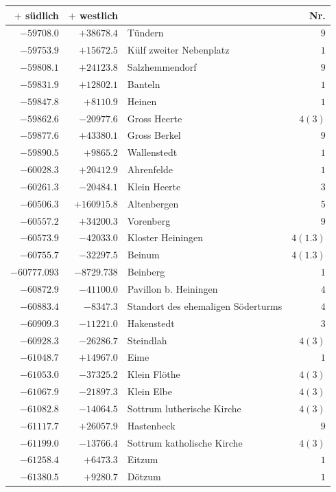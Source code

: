 \begin{center}\begingroup\fontsize{8}{9}\selectfont
\setlength{\tabcolsep}{4pt}
\begin{tabular}{r|r|p{170pt}|r}\hline
\(+\) südlich&\(+\) westlich&&Nr.\\\hline
\(-59708.0\)&\(+38678.4\)&Tündern&\(9\)\\
\(-59753.9\)&\(+15672.5\)&Külf zweiter Nebenplatz&\(1\)\\
\(-59808.1\)&\(+24123.8\)&Salzhemmendorf&\(9\)\\
\(-59831.9\)&\(+12802.1\)&Banteln&\(1\)\\
\(-59847.8\)&\(+8110.9\)&Heinen&\(1\)\\
\(-59862.6\)&\(-20977.6\)&Gross Heerte&\(4 (3)\)\\
\(-59877.6\)&\(+43380.1\)&Gross Berkel&\(9\)\\
\(-59890.5\)&\(+9865.2\)&Wallenstedt&\(1\)\\
\(-60028.3\)&\(+20412.9\)&Ahrenfelde&\(1\)\\
\(-60261.3\)&\(-20484.1\)&Klein Heerte&\(3\)\\
\(-60506.3\)&\(+160915.8\)&Altenbergen&\(5\)\\
\(-60557.2\)&\(+34200.3\)&Vorenberg&\(9\)\\
\(-60573.9\)&\(-42033.0\)&Kloster Heiningen&\(4(1.3)\)\\
\(-60755.7\)&\(-32297.5\)&Beinum&\(4(1.3)\)\\
\(-60777.093\)&\(-8729.738\)&Beinberg&\(1\)\\
\(-60872.9\)&\(-41100.0\)&Pavillon b. Heiningen&\(4\)\\
\(-60883.4\)&\(-8347.3\)&Standort des ehemaligen Söderturms&\(4\)\\
\(-60909.3\)&\(-11221.0\)&Hakenstedt&\(3\)\\
\(-60928.3\)&\(-26286.7\)&Steindlah&\(4 (3)\)\\
\(-61048.7\)&\(+14967.0\)&Eime&\(1\)\\
\(-61053.0\)&\(-37325.2\)&Klein Flöthe&\(4 (3)\)\\
\(-61067.9\)&\(-21897.3\)&Klein Elbe&\(4 (3)\)\\
\(-61082.8\)&\(-14064.5\)&Sottrum lutherische Kirche&\(4 (3)\)\\
\(-61117.7\)&\(+26057.9\)&Hastenbeck&\(9\)\\
\(-61199.0\)&\(-13766.4\)&Sottrum katholische Kirche&\(4 (3)\)\\
\(-61258.4\)&\(+6473.3\)&Eitzum&\(1\)\\
\(-61380.5\)&\(+9280.7\)&Dötzum&\(1\)\\

\end{tabular}
\end{center}
